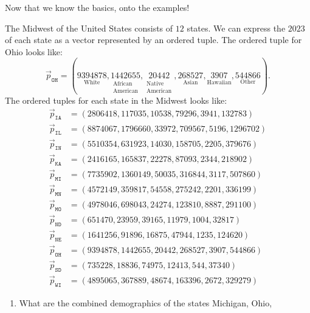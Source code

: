 \documentclass{ximera}
\begin{document}
Now that we know the basics, onto the examples!

\begin{example} %
  The Midwest of the United States consists of $12$ states. We can
  express the $2023$
  of each state as a vector represented by an ordered tuple. The
  ordered tuple for Ohio looks like:
  \[
  \vec{p}_{\texttt{OH}} = (\underset{\text{White}}{9394878},\underset{\begin{smallmatrix}\text{African}\\ \text{American}\end{smallmatrix}}{1442655},\underset{\begin{smallmatrix}\text{Native}\\\text{American}\end{smallmatrix}}{20442},\underset{\text{Asian}}{268527},\underset{\text{Hawaiian}}{3907},\underset{\text{Other}}{544866}).
  \]
  The ordered tuples for each state in the Midwest looks like:
\begin{align*}
  \vec{p}_{\texttt{IA}} &= (2806418,117035,10538,79296,3941,132783)\\
  \vec{p}_{\texttt{IL}} &= (8874067,1796660,33972,709567,5196,1296702)\\
  \vec{p}_{\texttt{IN}} &= (5510354,631923,14030,158705,2205,379676)\\
  \vec{p}_{\texttt{KA}} &= (2416165,165837,22278,87093,2344,218902)\\
  \vec{p}_{\texttt{MI}} &= (7735902,1360149,50035,316844,3117,507860)\\
  \vec{p}_{\texttt{MN}} &= (4572149,359817,54558,275242,2201,336199)\\
  \vec{p}_{\texttt{MO}} &= (4978046,698043,24274,123810,8887,291100)\\
  \vec{p}_{\texttt{ND}} &= (651470,23959,39165,11979,1004,32817)\\
  \vec{p}_{\texttt{NE}} &= (1641256,91896,16875,47944,1235,124620)\\
  \vec{p}_{\texttt{OH}} &= (9394878,1442655,20442,268527,3907,544866)\\
  \vec{p}_{\texttt{SD}} &= (735228,18836,74975,12413,544,37340)\\
  \vec{p}_{\texttt{WI}} &= (4895065,367889,48674,163396,2672,329279)
\end{align*}
\begin{enumerate}
\item What are the combined demographics of the states Michigan, Ohio,

\end{enumerate}
\end{example}
\end{document}
